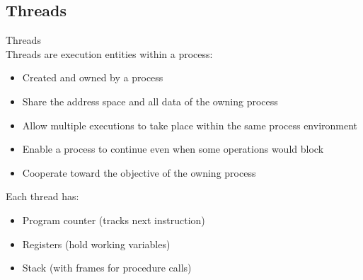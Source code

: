 \subsection{Threads}

\begin{definition}{Threads}\\
    Threads are execution entities within a process:
    \begin{itemize}
        \item Created and owned by a process
        \item Share the address space and all data of the owning process
        \item Allow multiple executions to take place within the same process environment
        \item Enable a process to continue even when some operations would block
        \item Cooperate toward the objective of the owning process
    \end{itemize}
    
    Each thread has:
    \begin{itemize}
        \item Program counter (tracks next instruction)
        \item Registers (hold working variables)
        \item Stack (with frames for procedure calls)
    \end{itemize}
\end{definition}

